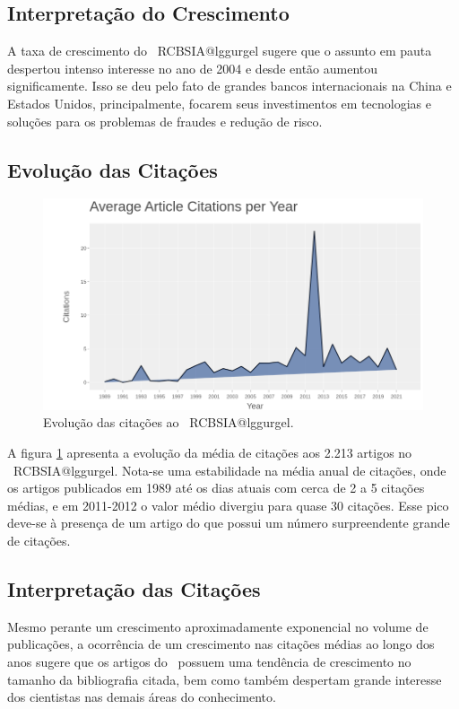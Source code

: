 \subsection{Interpretação do Crescimento} A taxa de crescimento do \dataset\   RCBSIA@lggurgel sugere que o assunto em pauta despertou intenso interesse no ano de 2004 e desde então aumentou significamente. Isso se deu pelo fato de grandes bancos internacionais na China e Estados Unidos, principalmente, focarem seus investimentos em tecnologias e soluções para os problemas de fraudes e redução de risco.

\subsection{Evolução das Citações}

\begin{figure}
    \centering
    \includegraphics[width=1\textwidth]{experiments/lggurgel/AnaliseBibliometrica/RiscoBancario/Figs/Descritiva/RCBSIA-MediaAnualCitacoes.png}
    \caption{Evolução das citações ao \dataset\   RCBSIA@lggurgel.}
    \label{fig:evol:anual:citacoes:RCBSIA@lggurgel}
\end{figure}

A figura \ref{fig:evol:anual:citacoes:RCBSIA@lggurgel} apresenta a evolução da média de citações aos 2.213 artigos no \dataset\   RCBSIA@lggurgel. 
Nota-se uma estabilidade na média anual de citações, onde os artigos publicados em 1989 até os dias atuais com cerca de 2 a 5 citações médias, e em 2011-2012 o valor médio divergiu para quase 30 citações. Esse pico deve-se à presença de um artigo do \dataset que possui um número surpreendente grande de citações.

\subsection{Interpretação das Citações}
Mesmo perante um crescimento aproximadamente exponencial no volume de publicações, a ocorrência de um crescimento nas citações médias ao longo dos anos sugere que os artigos do \dataset\   possuem uma tendência de crescimento no tamanho da bibliografia citada, bem como também despertam grande interesse dos cientistas nas demais áreas do conhecimento.

